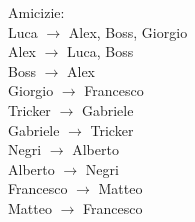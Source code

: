     Amicizie: \\
    Luca $\rightarrow$ Alex, Boss, Giorgio \\
    Alex $\rightarrow$ Luca, Boss \\
    Boss $\rightarrow$ Alex \\
    Giorgio $\rightarrow$ Francesco \\
    Tricker $\rightarrow$ Gabriele \\
    Gabriele $\rightarrow$ Tricker \\
    Negri $\rightarrow$ Alberto \\
    Alberto $\rightarrow$ Negri \\
    Francesco $\rightarrow$ Matteo \\
    Matteo $\rightarrow$ Francesco \\